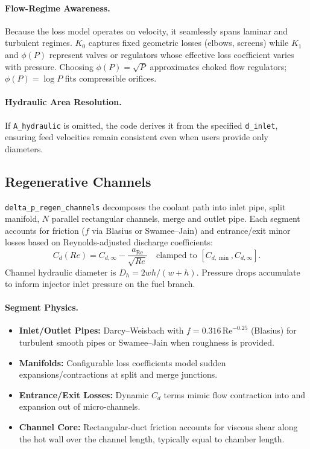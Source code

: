\documentclass[12pt]{article}
\begin{document}
\paragraph{Flow-Regime Awareness.}  Because the loss model operates on velocity, it seamlessly spans laminar and turbulent regimes.  $K_0$ captures fixed geometric losses (elbows, screens) while $K_1$ and $\phi(P)$ represent valves or regulators whose effective loss coefficient varies with pressure.  Choosing $\phi(P) = \sqrt{P}$ approximates choked flow regulators; $\phi(P) = \log P$ fits compressible orifices.

\paragraph{Hydraulic Area Resolution.}  If \verb|A_hydraulic| is omitted, the code derives it from the specified \verb|d_inlet|, ensuring feed velocities remain consistent even when users provide only diameters.

\subsection{Regenerative Channels}
\verb|delta_p_regen_channels| decomposes the coolant path into inlet pipe, split manifold, $N$ parallel rectangular channels, merge and outlet pipe.  Each segment accounts for friction ($f$ via Blasius or Swamee--Jain) and entrance/exit minor losses based on Reynolds-adjusted discharge coefficients:
\[
C_d(Re) = C_{d,\infty} - \frac{a_{\text{Re}}}{\sqrt{Re}}\quad \text{clamped to }[C_{d,\min}, C_{d,\infty}].
\]
Channel hydraulic diameter is $D_h = 2wh/(w+h)$.  Pressure drops accumulate to inform injector inlet pressure on the fuel branch.

\paragraph{Segment Physics.}
\begin{itemize}
    \item \textbf{Inlet/Outlet Pipes:} Darcy--Weisbach with $f = 0.316\,\text{Re}^{-0.25}$ (Blasius) for turbulent smooth pipes or Swamee--Jain when roughness is provided.
    \item \textbf{Manifolds:} Configurable loss coefficients model sudden expansions/contractions at split and merge junctions.
    \item \textbf{Entrance/Exit Losses:} Dynamic $C_d$ terms mimic flow contraction into and expansion out of micro-channels.
    \item \textbf{Channel Core:} Rectangular-duct friction accounts for viscous shear along the hot wall over the channel length, typically equal to chamber length.
\end{itemize}
\end{document}
